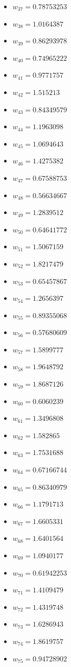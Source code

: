 \documentclass[11pt]{article}
\begin{document}
\begin{itemize}
\item $w_{37} = 0.78753253$
\item $w_{38} = 1.0164387$
\item $w_{39} = 0.86293978$
\item $w_{40} = 0.74965222$
\item $w_{41} = 0.9771757$
\item $w_{42} = 1.515213$
\item $w_{43} = 0.84349579$
\item $w_{44} = 1.1963098$
\item $w_{45} = 1.0694643$
\item $w_{46} = 1.4275382$
\item $w_{47} = 0.67588753$
\item $w_{48} = 0.56634667$
\item $w_{49} = 1.2839512$
\item $w_{50} = 0.64641772$
\item $w_{51} = 1.5067159$
\item $w_{52} = 1.8217479$
\item $w_{53} = 0.65457867$
\item $w_{54} = 1.2656397$
\item $w_{55} = 0.89355068$
\item $w_{56} = 0.57680609$
\item $w_{57} = 1.5899777$
\item $w_{58} = 1.9648792$
\item $w_{59} = 1.8687126$
\item $w_{60} = 0.6060239$
\item $w_{61} = 1.3496808$
\item $w_{62} = 1.582865$
\item $w_{63} = 1.7531688$
\item $w_{64} = 0.67166744$
\item $w_{65} = 0.86340979$
\item $w_{66} = 1.1791713$
\item $w_{67} = 1.6605331$
\item $w_{68} = 1.6401564$
\item $w_{69} = 1.0940177$
\item $w_{70} = 0.61942253$
\item $w_{71} = 1.4109479$
\item $w_{72} = 1.4319748$
\item $w_{73} = 1.6286943$
\item $w_{74} = 1.8619757$
\item $w_{75} = 0.94728902$

\end{itemize}
\end{document}
